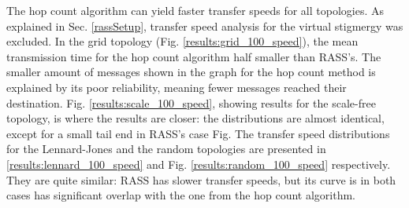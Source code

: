
The hop count algorithm can yield faster transfer speeds for all topologies. As explained in Sec. \ref{rassSetup}, transfer speed analysis for the virtual stigmergy was excluded. In the grid topology (Fig. \ref{results:grid_100_speed}), the mean transmission time for the hop count algorithm half smaller than \ac{RASS}'s. The smaller amount of messages shown in the graph for the hop count method is explained by its poor reliability, meaning fewer messages reached their destination. Fig. \ref{results:scale_100_speed}, showing results for the scale-free topology, is where the results are closer: the distributions are almost identical, except for a small tail end in \ac{RASS}'s case Fig. The transfer speed distributions for the Lennard-Jones and the random topologies are presented in  \ref{results:lennard_100_speed} and Fig. \ref{results:random_100_speed} respectively. They are quite similar: \ac{RASS} has slower transfer speeds, but its curve is in both cases has significant overlap with the one from the hop count algorithm.

